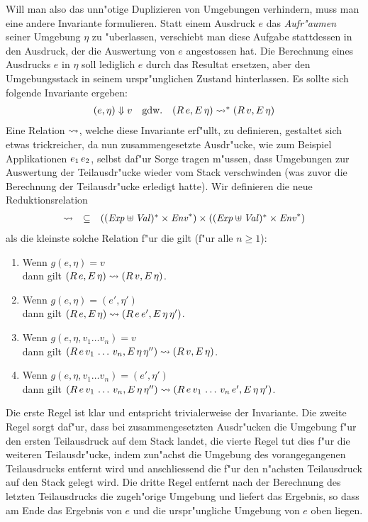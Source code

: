 \documentclass[12pt,a4paper,draft]{article}
\begin{document}
Will man also das unn"otige Duplizieren von Umgebungen verhindern, muss man eine andere Invariante formulieren.
Statt einem Ausdruck $e$ das \emph{Aufr"aumen} seiner Umgebung $\eta$ zu "uberlassen, verschiebt man diese
Aufgabe stattdessen in den Ausdruck, der die Auswertung von $e$ angestossen hat. Die Berechnung eines Ausdrucks
$e$ in $\eta$ soll lediglich $e$ durch das Resultat ersetzen, aber den Umgebungsstack in seinem urspr"unglichen
Zustand hinterlassen. Es sollte sich folgende Invariante ergeben:
\[\begin{array}{rcl}
  (e,\eta) \Downarrow v & \text{gdw.} & (R\,e,E\,\eta) \rightsquigarrow^* (R\,v,E\,\eta)
\end{array}\]
Eine Relation $\rightsquigarrow$, welche diese Invariante erf"ullt, zu definieren, gestaltet sich etwas trickreicher,
da nun zusammengesetzte Ausdr"ucke, wie zum Beispiel Applikationen ${e_1}\,{e_2}$, selbst daf"ur Sorge
tragen m"ussen, dass Umgebungen zur Auswertung der Teilausdr"ucke wieder vom Stack verschwinden (was zuvor
die Berechnung der Teilausdr"ucke erledigt hatte). Wir definieren die neue Reduktionsrelation
\[\begin{array}{rcl}
  \rightsquigarrow & \subseteq & ((\mathit{Exp} \uplus \mathit{Val})^* \times \mathit{Env}^*) \times ((\mathit{Exp} \uplus \mathit{Val})^* \times \mathit{Env}^*)
\end{array}\]
als die kleinste solche Relation f"ur die gilt (f"ur alle $n \ge 1$):
\begin{enumerate}
\item Wenn $g(e,\eta) = v$ \\
  dann gilt $(R\,e,E\,\eta) \rightsquigarrow (R\,v,E\,\eta)$.
\item Wenn $g(e,\eta) = (e',\eta')$ \\
  dann gilt $(R\,e,E\,\eta) \rightsquigarrow (R\,e\,e',E\,\eta\,\eta')$.
\item Wenn $g(e,\eta,v_1 \ldots v_n) = v$ \\
  dann gilt $(R\,e\,v_1\,\ldots\,v_n,E\,\eta\,\eta'') \rightsquigarrow (R\,v,E\,\eta)$.
\item Wenn $g(e,\eta,v_1 \ldots v_n) = (e',\eta')$ \\
  dann gilt $(R\,e\,v_1\,\ldots\,v_n,E\,\eta\,\eta'') \rightsquigarrow (R\,e\,v_1\,\ldots\,v_n\,e',E\,\eta\,\eta')$.
\end{enumerate}
Die erste Regel ist klar und entspricht trivialerweise der Invariante. Die zweite Regel sorgt daf"ur, dass
bei zusammengesetzten Ausdr"ucken die Umgebung f"ur den ersten Teilausdruck auf dem Stack landet, die vierte
Regel tut dies f"ur die weiteren Teilausdr"ucke, indem zun"achst die Umgebung des vorangegangenen Teilausdrucks
entfernt wird und anschliessend die f"ur den n"achsten Teilausdruck auf den Stack gelegt wird. Die dritte
Regel entfernt nach der Berechnung des letzten Teilausdrucks die zugeh"orige Umgebung und liefert das
Ergebnis, so dass am Ende das Ergebnis von $e$ und die urspr"ungliche Umgebung von $e$ oben liegen.
\end{document}
